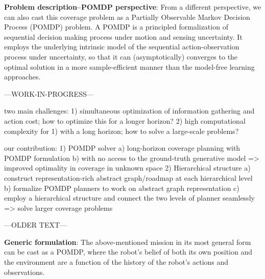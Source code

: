 \documentclass{article}
\newcommand{\ph}[1]{{\textbf{#1}:}} %
\begin{document}
\ph{Problem description--POMDP perspective}
From a different perspective, we can also cast this coverage problem as a Partially Observable Markov Decision Process (POMDP) problem. 
A POMDP is a principled formalization of sequential decision making process under motion and sensing uncertainty.
It employs the underlying intrinsic model of the sequential action-observation process under uncertainty, so that it can (asymptotically) converges to the optimal solution in a more sample-efficient manner than the model-free learning approaches.






---WORK-IN-PROGRESS---

two main challenges:
1) simultaneous optimization of information gathering and action cost; how to optimize this for a longer horizon?
2) high computational complexity for 1) with a long horizon; how to solve a large-scale problems?

our contribution:
1) POMDP solver
  a) long-horizon coverage planning with POMDP formulation 
  b) with no access to the ground-truth generative model
  => improved optimality in coverage in unknown space
2) Hierarchical structure
  a) construct representation-rich abstract graph/roadmap at each hierarchical level
  b) formalize POMDP planners to work on abstract graph representation
  c) employ a hierarchical structure and connect the two levels of planner seamlessly
  => solve larger coverage problems


---OLDER TEXT---

\ph{Generic formulation}
The above-mentioned mission in its most general form can be cast as a POMDP, where the robot's belief of both its own position and the environment are a function of the history of the robot's actions and observations.  
\end{document}
